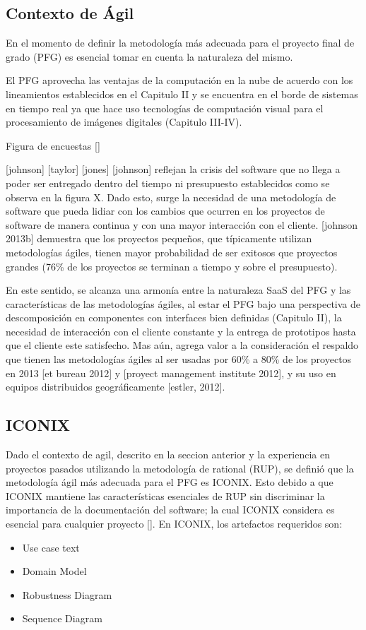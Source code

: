 \subsection{Contexto de Ágil}
En el momento de definir la metodología más adecuada para el proyecto final de grado (PFG) es esencial tomar en cuenta la naturaleza del mismo.

El PFG aprovecha las ventajas de la computación en la nube de acuerdo con los lineamientos establecidos en el Capitulo II y se encuentra en el borde de sistemas en tiempo real ya que hace uso tecnologías de computación visual para el procesamiento de imágenes digitales (Capitulo III-IV). 

Figura de encuestas [] 

 [johnson] [taylor] [jones] [johnson] reflejan la crisis del software que no llega a poder ser entregado dentro del tiempo ni presupuesto establecidos como se observa en la figura X. Dado esto, surge la necesidad de una metodología de software que pueda lidiar con los cambios que ocurren en los proyectos de software de manera continua y con una mayor interacción con el cliente. [johnson  2013b] demuestra que los proyectos pequeños, que típicamente utilizan metodologías ágiles, tienen mayor probabilidad de ser exitosos que proyectos grandes (76\% de los proyectos se terminan a tiempo y sobre el presupuesto). 

En este sentido, se alcanza una armonía entre la naturaleza SaaS del PFG y las características de las metodologías ágiles, al estar el PFG  bajo una perspectiva de descomposición en componentes con interfaces bien definidas (Capitulo II), la necesidad de interacción con el cliente constante y la entrega de prototipos hasta que el cliente este satisfecho. Mas aún, agrega valor a la consideración el respaldo que tienen las metodologías ágiles al ser usadas por 60\% a 80\% de los proyectos en 2013 [et bureau 2012] y [proyect management institute 2012], y su uso en equipos distribuidos geográficamente [estler, 2012]. 


\subsection{ICONIX}
Dado el contexto de agil, descrito en la seccion anterior y la experiencia en proyectos pasados utilizando la metodología de rational (RUP), se definió que la metodología ágil más adecuada para el PFG es ICONIX. Esto debido a que ICONIX mantiene las características esenciales de RUP sin discriminar la importancia de la documentación del software; la cual ICONIX considera es esencial para cualquier proyecto []. 
En ICONIX, los artefactos requeridos son:
\begin{itemize}
  \item Use case text
  \item Domain Model
  \item Robustness Diagram
  \item Sequence Diagram
 
\end{itemize}
